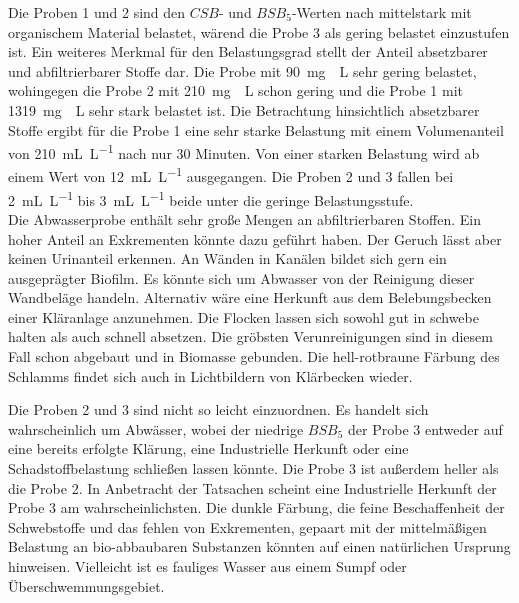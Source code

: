 Die Proben 1 und 2 sind den $CSB$- und $BSB_5$-Werten nach mittelstark mit organischem Material belastet, wärend die Probe 3 als gering belastet einzustufen ist.
Ein weiteres Merkmal für den Belastungsgrad stellt der Anteil absetzbarer und abfiltrierbarer Stoffe dar. Die Probe mit \SI{90}{\milli\gram
	\per\liter} sehr gering belastet, wohingegen die Probe 2 mit \SI{210}{\milli\gram
	\per\liter} schon gering und die Probe 1 mit \SI{1319}{\milli\gram
	\per\liter} sehr stark belastet ist.
Die Betrachtung hinsichtlich absetzbarer Stoffe ergibt für die Probe 1 eine sehr starke Belastung mit einem Volumenanteil von \SI{210}{\milli\liter\per\liter} nach nur 30 Minuten. Von einer starken Belastung wird ab einem Wert von \SI{12}{\milli\liter\per\liter} ausgegangen. Die Proben 2 und 3 fallen bei \SI{2}{\milli\liter\per\liter} bis \SI{3}{\milli\liter\per\liter} beide unter die geringe Belastungsstufe.\\


Die Abwasserprobe enthält sehr große Mengen an abfiltrierbaren Stoffen. Ein hoher Anteil an Exkrementen könnte dazu geführt haben. Der Geruch lässt aber keinen Urinanteil erkennen. An Wänden in Kanälen bildet sich gern ein ausgeprägter Biofilm. Es könnte sich um Abwasser von der Reinigung dieser Wandbeläge handeln. Alternativ wäre eine Herkunft aus dem Belebungsbecken einer Kläranlage anzunehmen. Die Flocken lassen sich sowohl gut in schwebe halten als auch schnell absetzen. Die gröbsten Verunreinigungen sind in diesem Fall schon abgebaut und in Biomasse gebunden. Die hell-rotbraune Färbung des Schlamms findet sich auch in Lichtbildern von Klärbecken wieder.

Die Proben 2 und 3 sind nicht so leicht einzuordnen. Es handelt sich wahrscheinlich um Abwässer, wobei der niedrige $BSB_5$ der Probe 3 entweder auf eine bereits erfolgte Klärung, eine Industrielle Herkunft oder eine Schadstoffbelastung schließen lassen könnte. Die Probe 3 ist außerdem heller als die Probe 2. In Anbetracht der Tatsachen scheint eine Industrielle Herkunft der Probe 3 am wahrscheinlichsten.
Die dunkle Färbung, die feine Beschaffenheit der Schwebstoffe und das fehlen von Exkrementen, gepaart mit der mittelmäßigen Belastung an bio-abbaubaren Substanzen könnten auf einen natürlichen Ursprung hinweisen. Vielleicht ist es fauliges Wasser aus einem Sumpf oder Überschwemmungsgebiet.\\


